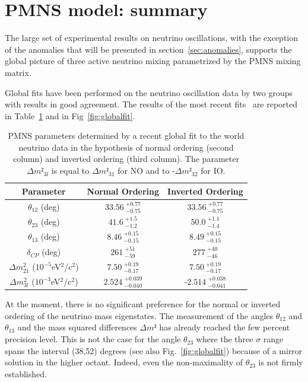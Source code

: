 \section{ PMNS model: summary}
\label{sec:summary}


The large set of experimental results on neutrino oscillations, with the exception of the anomalies that will be presented in section~\ref{sec:anomalies}, supports the global picture of three active neutrino mixing parametrized by the PMNS mixing matrix.

Global fits have been performed on the neutrino oscillation data by two groups~\cite{nufit,fogli} with results in good agreement.
The results of the most recent fits~\cite{nufit} are reported in Table~\ref{tab:globalfit} and in Fig~\ref{fig:globalfit}.

\begin{table}[htbp]
\centering
\begin{tabular}{|c|c|c|}
  \hline
  Parameter & Normal Ordering & Inverted Ordering  \\ 
  \hline
$\theta_{12}$ (deg)& $33.56\:^{+0.77}_{-0.75}$ &  $33.56\:^{+0.77}_{-0.75}$\\  
  $\theta_{23}$ (deg)& $41.6\:^{+1.5}_{-1.2}$ &  $50.0\:^{+1.1}_{-1.4}$\\  
  $\theta_{13}$ (deg)& $8.46\:^{+0.15}_{-0.15}$ & $8.49\:^{+0.15}_{-0.15}$ \\  
  $\delta_{CP}$ (deg)&  $261\:^{+51}_{-59}$& $277\:^{+40}_{-46}$ \\  
  $\Delta m^2_{21}$ ($10^{-5}$eV$^2$/c$^2$)& $7.50\:^{+0.19}_{-0.17}$ & $7.50\:^{+0.19}_{-0.17}$ \\  
  $\Delta m^2_{3l}$ ($10^{-3}$eV$^2$/c$^2$)&  $2.524\:^{+0.039}_{-0.040}$&  -$2.514\:^{+0.038}_{-0.041}$\\  
  \hline
\end{tabular}
\caption{
PMNS parameters determined by a recent global fit to the world neutrino data \cite{nufit} in the hypothesis of normal ordering (second column) and inverted ordering (third column). The parameter $\Delta m²_{3l}$ is equal to $\Delta m²_{31}$ for NO and to -$\Delta m²_{32}$ for IO. }
\label{tab:globalfit}
\end{table}


At the moment, there is no significant preference for the normal or inverted ordering of the neutrino mass eigenstates. The measurement of the angles $\theta_{12}$ and 
$\theta_{13}$ and the mass squared differences $\Delta m² $ has already reached the few percent precision level. This is not the case for the angle $\theta_{23}$ where the three $\sigma$ range spans the interval (38,52) degrees (see also Fig.~\ref{fig:globalfit}) because of a mirror solution in the higher octant. Indeed, even the non-maximality of $\theta_{23}$ is not firmly established. 

